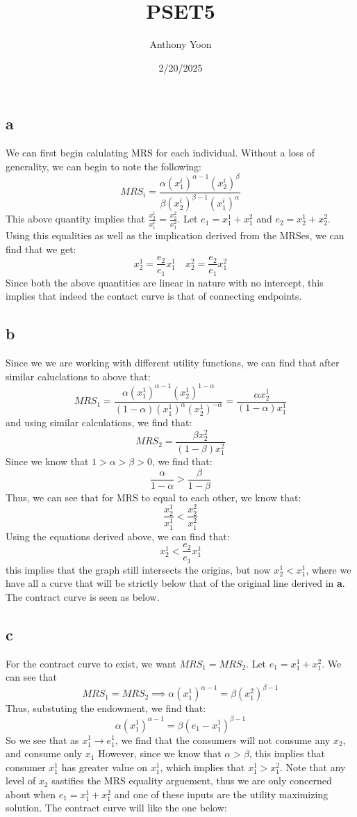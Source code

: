 \documentclass[11pt]{article}
\title{PSET5}
\author{Anthony Yoon}
\date{2/20/2025}
\begin{document}
\maketitle
\section{}
\subsection*{a}
We can first begin calulating MRS for each individual. Without a loss of generality, we can begin to note the following:
\[
MRS_i = \frac{\alpha (x_1^i)^{\alpha -1}(x_2^i)^\beta}{\beta(x_2^i)^{\beta - 1}(x_1^i)^\alpha}
\]
This above quantity implies that $\frac{x_2^1}{x_1^1} = \frac{x_2^2}{x_1^2}$. Let $e_1 = x_1^1 + x_1^2$ and $e_2 = x_2^1 + x_2^2$. Using this equalities as well as the implication derived from the MRSes, we can find that we get:
\[
x_2^1 = \frac{e_2}{e_1} x_1^1 \quad x_2^2 = \frac{e_2}{e_1} x_1^2
\]
Since both the above quantities are linear in nature with no intercept, this implies that indeed the contact curve is that of connecting endpoints. 
\subsection*{b}
Since we we are working with different utility functions, we can find that after similar caluclations to above that:
\[
MRS_1 = \frac{\alpha (x_1^1)^{\alpha - 1}(x_2^1)^{1-\alpha}}{(1-\alpha)(x_1^1)^\alpha (x_2^1)^{-\alpha}} = \frac{\alpha x_2^1}{(1-\alpha)x_1^1}
\]
and using similar calculations, we find that:
\[
MRS_2 = \frac{\beta x^2_2}{(1-\beta)x_1^2}
\]
Since we know that $1 > \alpha > \beta > 0$, we find that:
\[
\frac{\alpha}{1-\alpha} > \frac{\beta}{1-\beta}
\]
Thus, we can see that for MRS to equal to each other, we know that:
\[
\frac{x_2^1}{x_1^1} < \frac{x^2_2}{x^2_1}
\]
Using the equations derived above, we can find that:
\[
x_2^1 < \frac{e_2}{e_1} x_1^1
\]
this implies that the graph still intersects the origins, but now $x_2^1 < x_1^1$, where we have all a curve that will be strictly below that of the original line derived in \textbf{a}. The contract curve is seen as below. 
\subsection*{c}
For the contract curve to exist, we want $MRS_1 = MRS_2$. Let $e_1 = x_1^1 + x_1^2$. We can see that
\[
MRS_1 = MRS_2 \implies \alpha (x_1^1)^{\alpha - 1} = \beta (x_1^2)^{\beta - 1}
\]
Thus, substuting the endowment, we find that:
\[
    \alpha(x_1^1)^{\alpha - 1} = \beta (e_1 - x_1^1)^{\beta - 1}
\]
So we see that as $ x_1^1 \to e^1_1$, we find that the consumers will not consume any $x_2$, and consume only $x_1$ However, since we know that $\alpha > \beta$, this implies that consumer $x_1^1$ has greater value on $x_1^1$, which implies that $x_1^1  > x_1^2$. Note that any level of $x_2$ sastifies the MRS equality arguement, thus we are only concerned about when $e_1 = x_1^1 + x_1^2$ and one of these inputs are the utility maximizing solution. The contract curve will like the one below:
\end{document}
